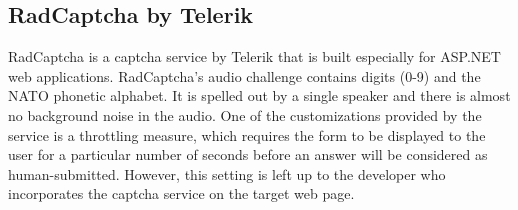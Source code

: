 \subsection{RadCaptcha by Telerik}

RadCaptcha is a captcha service by Telerik that is built especially for ASP.NET 
web applications. 
RadCaptcha's audio challenge contains digits (0-9) and the NATO phonetic alphabet. It is 
spelled out by a single speaker and there is almost no background noise in the audio. 
One of the customizations provided by the service is a throttling measure, which requires the form to 
be displayed to the user for a particular number of seconds before an answer will be considered as 
human-submitted. However, this setting is left up to the developer who incorporates the captcha 
service on the target web page.
